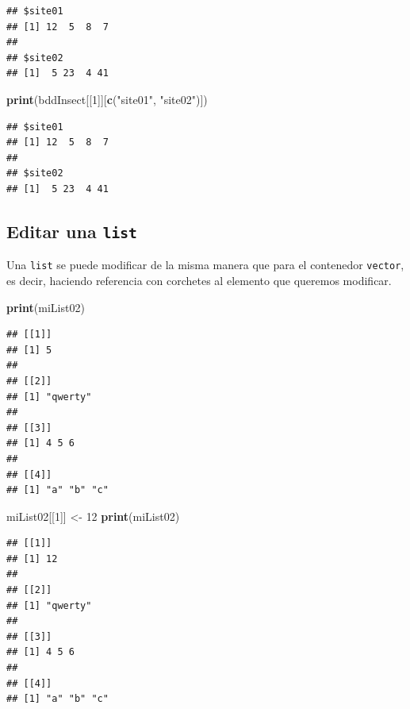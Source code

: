 \documentclass[
]{book}
\newenvironment{Shaded}{\begin{snugshade}}{\end{snugshade}}
\newcommand{\DecValTok}[1]{\textcolor[rgb]{0.00,0.00,0.81}{#1}}
\newcommand{\KeywordTok}[1]{\textcolor[rgb]{0.13,0.29,0.53}{\textbf{#1}}}
\newcommand{\NormalTok}[1]{#1}
\newcommand{\StringTok}[1]{\textcolor[rgb]{0.31,0.60,0.02}{#1}}
\begin{document}
\begin{verbatim}
## $site01
## [1] 12  5  8  7
## 
## $site02
## [1]  5 23  4 41
\end{verbatim}

\begin{Shaded}
\begin{Highlighting}[]
\KeywordTok{print}\NormalTok{(bddInsect[[}\DecValTok{1}\NormalTok{]][}\KeywordTok{c}\NormalTok{(}\StringTok{"site01"}\NormalTok{, }\StringTok{"site02"}\NormalTok{)])}
\end{Highlighting}
\end{Shaded}

\begin{verbatim}
## $site01
## [1] 12  5  8  7
## 
## $site02
## [1]  5 23  4 41
\end{verbatim}

\hypertarget{editar-una-list}{%
\subsection{\texorpdfstring{Editar una \texttt{list}}{Editar una list}}\label{editar-una-list}}

Una \texttt{list} se puede modificar de la misma manera que para el contenedor \texttt{vector}, es decir, haciendo referencia con corchetes al elemento que queremos modificar.

\begin{Shaded}
\begin{Highlighting}[]
\KeywordTok{print}\NormalTok{(miList02)}
\end{Highlighting}
\end{Shaded}

\begin{verbatim}
## [[1]]
## [1] 5
## 
## [[2]]
## [1] "qwerty"
## 
## [[3]]
## [1] 4 5 6
## 
## [[4]]
## [1] "a" "b" "c"
\end{verbatim}

\begin{Shaded}
\begin{Highlighting}[]
\NormalTok{miList02[[}\DecValTok{1}\NormalTok{]] <-}\StringTok{ }\DecValTok{12}
\KeywordTok{print}\NormalTok{(miList02)}
\end{Highlighting}
\end{Shaded}

\begin{verbatim}
## [[1]]
## [1] 12
## 
## [[2]]
## [1] "qwerty"
## 
## [[3]]
## [1] 4 5 6
## 
## [[4]]
## [1] "a" "b" "c"
\end{verbatim}
\end{document}
